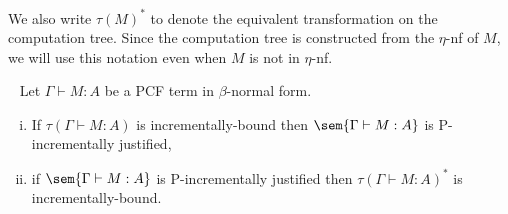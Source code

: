 We also write $\tau(M)^*$ to denote the equivalent transformation on the computation tree. Since the computation tree is constructed from the $\eta$-nf of $M$, we will use this notation even when $M$ is not in $\eta$-nf.



\begin{proposition} \
\label{prop:incrbound_imp_incrjustified_pcf} Let $\Gamma \vdash M : A$ be a PCF term in $\beta$-normal form.
\begin{enumerate}[(i)]
\item  If $\tau(\Gamma \vdash M : A)$ is incrementally-bound then $\sem{\Gamma \vdash M : A}$ is P-incrementally justified,
\item  if $\sem{\Gamma \vdash M : A}$ is P-incrementally justified
then $\tau(\Gamma \vdash M : A)^*$ is incrementally-bound.
\end{enumerate}
\end{proposition}
